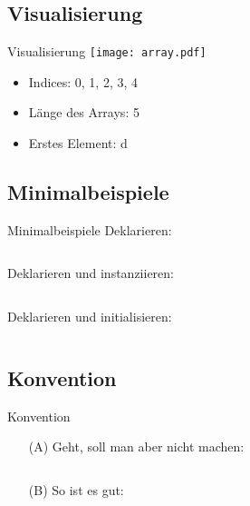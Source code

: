 \documentclass[usepdftitle=false,hyperref={pdfpagelabels=false}]{beamer}
\begin{document}
\subsection{Visualisierung}
\begin{frame}{Visualisierung}
    \texttt{[image: array.pdf]}
    \begin{itemize}
        \item Indices: 0, 1, 2, 3, 4
        \item Länge des Arrays: 5
        \item Erstes Element: d
    \end{itemize}
\end{frame}

\subsection{Minimalbeispiele}
\begin{frame}{Minimalbeispiele}
Deklarieren:
    \inputminted[linenos=false, numbersep=5pt, tabsize=4,firstline=1, lastline=1, fontsize=\small]{java}{singleLines.java}
\vspace{5 mm}
Deklarieren und instanziieren:
    \inputminted[linenos=false, numbersep=5pt, tabsize=4,firstline=2, lastline=2, fontsize=\small]{java}{singleLines.java}
\vspace{5 mm}
Deklarieren und initialisieren:
    \inputminted[linenos=false, numbersep=5pt, tabsize=4,firstline=3, lastline=4, fontsize=\small]{java}{singleLines.java}
\end{frame}

\subsection{Konvention}
\begin{frame}{Konvention}
    \begin{itemize}
        \item[(A)] Geht, soll man aber nicht machen:
                   \inputminted[linenos=false, numbersep=5pt, tabsize=4,firstline=6, lastline=6, fontsize=\small]{java}{singleLines.java}
        \item[(B)] So ist es gut:
                   \inputminted[linenos=false, numbersep=5pt, tabsize=4,firstline=5, lastline=5, fontsize=\small]{java}{singleLines.java}
    \end{itemize}

\end{frame}
\end{document}
